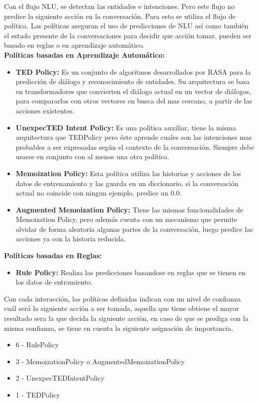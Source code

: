 Con el flujo NLU, se detectan las entidades e intenciones. Pero este flujo no predice la siguiente acción en la 
conversación. Para esto se utiliza el flujo de política. Las políticas aseguran el uso de predicciones de NLU así como 
también el estado presente de la conversaciones para decidir que acción tomar, pueden ser basado en reglas o en aprendizaje automático.\\
\textbf{Políticas basadas en Aprendizaje Automático:}
\begin{itemize}
    \item \textbf{TED Policy:}
    Es un conjunto de algoritmos desarrollados por RASA para la predicción de diálogo y reconocimiento de entidades. Su arquitectura se basa en transformadores que convierten el diálogo actual en un vector de diálogos, para compararlos con otros vectores en busca del mas cercano, a partir de las acciones existentes.\cite{ConversationalAIwithRasa}
    \item \textbf{UnexpecTED Intent Policy:} Es una política auxiliar, tiene la misma arquitectura que TEDPolicy pero éste aprende cuales son las intenciones mas probables a ser expresadas según el contexto de la conversación. Siempre debe usarse en conjunto con al menos una otra política.\cite{UnexpecTED}
    \item \textbf{Memoization Policy: }Esta política utiliza las historias y acciones de los datos de entrenamiento y las guarda en un diccionario, si la conversación actual no coincide con ningun ejemplo, predice un 0.0.\cite{MemoizationPolicy}
    \item \textbf{Augmented Memoization Policy: } Tiene las mismas funcionalidades de Memoization Policy, pero además cuenta con un mecanismo que permite olvidar de forma aleatoria algunas partes de la conversación, luego predice las acciones ya con la historia reducida.\cite{AugmentedMemoizationPolicy}
\end{itemize}
\textbf{Políticas basadas en Reglas:}
\begin{itemize}
    \item \textbf{Rule Policy:} Realiza las predicciones basandose en reglas que se tienen en los datos de entramiento.
\end{itemize}
Con cada interacción, las políticas definidas indican con un nivel de confianza cuál será la siguiente acción a ser tomada, aquella que tiene obtiene el mayor resultado sera la que decida la siguiente acción, en caso de que se prediga con la misma confianza, se tiene en cuenta la siguiente asignación de importancia.
\begin{itemize}
    \item 6 - RulePolicy
    \item 3 - MemoizationPolicy o AugmentedMemoizationPolicy
    \item 2 -  UnexpecTEDIntentPolicy
    \item 1 - TEDPolicy
\end{itemize}

